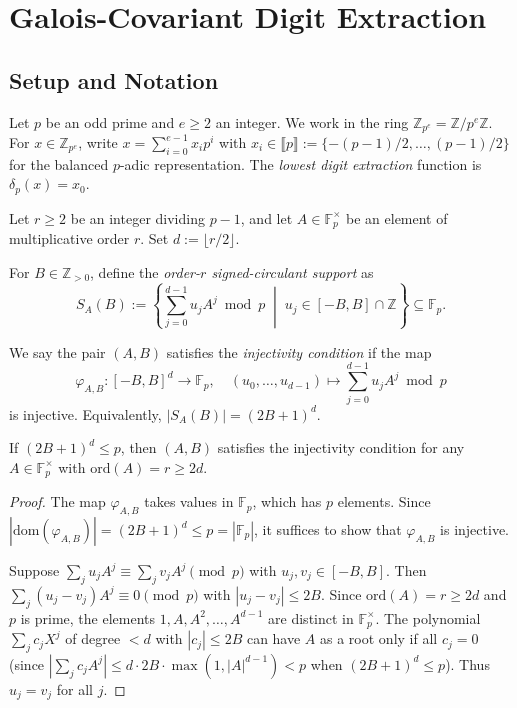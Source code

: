 
\section{Galois-Covariant Digit Extraction}

\subsection{Setup and Notation}

Let $p$ be an odd prime and $e \geq 2$ an integer.
We work in the ring $\mathbb{Z}_{p^e} = \mathbb{Z}/p^e\mathbb{Z}$.
For $x \in \mathbb{Z}_{p^e}$, write $x = \sum_{i=0}^{e-1} x_i p^i$ with $x_i \in \llbracket p \rrbracket := \{-(p-1)/2, \ldots, (p-1)/2\}$ for the balanced $p$-adic representation.
The \emph{lowest digit extraction} function is $\delta_p(x) = x_0$.

Let $r \geq 2$ be an integer dividing $p-1$, and let $A \in \mathbb{F}_p^\times$ be an element of multiplicative order $r$.
Set $d := \lfloor r/2 \rfloor$.

\begin{definition}
For $B \in \mathbb{Z}_{>0}$, define the \emph{order-$r$ signed-circulant support} as
\[
S_A(B) := \left\{ \sum_{j=0}^{d-1} u_j A^j \bmod p \;\middle|\; u_j \in [-B, B] \cap \mathbb{Z} \right\} \subseteq \mathbb{F}_p.
\]
\end{definition}

\begin{definition}
We say the pair $(A, B)$ satisfies the \emph{injectivity condition} if the map
\[
\varphi_{A,B} : [-B,B]^d \longrightarrow \mathbb{F}_p, \quad (u_0, \ldots, u_{d-1}) \longmapsto \sum_{j=0}^{d-1} u_j A^j \bmod p
\]
is injective. Equivalently, $|S_A(B)| = (2B+1)^d$.
\end{definition}

\begin{lemma}\label{lem:injectivity}
If $(2B+1)^d \leq p$, then $(A, B)$ satisfies the injectivity condition for any $A \in \mathbb{F}_p^\times$ with $\mathrm{ord}(A) = r \geq 2d$.
\end{lemma}

\begin{proof}
The map $\varphi_{A,B}$ takes values in $\mathbb{F}_p$, which has $p$ elements.
Since $|\mathrm{dom}(\varphi_{A,B})| = (2B+1)^d \leq p = |\mathbb{F}_p|$,
it suffices to show that $\varphi_{A,B}$ is injective.

Suppose $\sum_j u_j A^j \equiv \sum_j v_j A^j \pmod{p}$ with $u_j, v_j \in [-B, B]$.
Then $\sum_j (u_j - v_j) A^j \equiv 0 \pmod{p}$ with $|u_j - v_j| \leq 2B$.
Since $\mathrm{ord}(A) = r \geq 2d$ and $p$ is prime, the elements $1, A, A^2, \ldots, A^{d-1}$ are distinct in $\mathbb{F}_p^\times$.
The polynomial $\sum_j c_j X^j$ of degree $< d$ with $|c_j| \leq 2B$ can have $A$ as a root only if all $c_j = 0$ (since $|\sum_j c_j A^j| \leq d \cdot 2B \cdot \max(1, |A|^{d-1}) < p$ when $(2B+1)^d \leq p$).
Thus $u_j = v_j$ for all $j$.
\end{proof}

